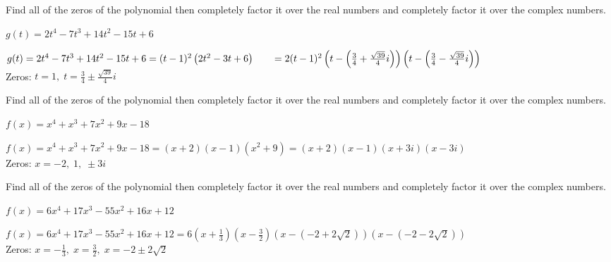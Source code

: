 \documentclass{ximera}
\begin{document}
\begin{problem}
Find all of the zeros of the polynomial then completely factor it over the real numbers and completely factor it over the complex numbers.

$g(t) = 2t^4-7t^3+14t^2-15t+6$

\begin{solution}
$g(t) = 2t^4-7t^3+14t^2-15t+6 = (t-1)^2 \left(2t^2 - 3t + 6\right)  \\
\phantom{f(t)} = 2 (t-1)^2 \left( t - \left( \frac{3}{4} +  \frac{\sqrt{39}}{4} i \right) \right)  \left( t - \left( \frac{3}{4} -  \frac{\sqrt{39}}{4} i \right) \right) $ \\
Zeros: $t = 1, \; t = \frac{3}{4}  \pm  \frac{\sqrt{39}}{4} i$
\end{solution}

\end{problem}

\begin{problem}
Find all of the zeros of the polynomial then completely factor it over the real numbers and completely factor it over the complex numbers.

$f(x) = x^4+x^3+7x^2+9x-18$

\begin{solution}
$f(x) = x^4+x^3+7x^2+9x-18 = (x+2)(x-1)\left(x^2+9\right) = (x+2)(x-1)(x+3i)(x-3i)$\\
Zeros:  $x = -2, \; 1, \; \pm 3i$
\end{solution}

\end{problem}

\begin{problem}
Find all of the zeros of the polynomial then completely factor it over the real numbers and completely factor it over the complex numbers.

$f(x) = 6x^4+17x^3-55x^2+16x+12$

\begin{solution}
$f(x) = 6x^4+17x^3-55x^2+16x+12 = 6 \left(x + \frac{1}{3} \right) \left(x - \frac{3}{2} \right) \left(x - \left( -2 + 2 \sqrt{2}\right)\right) \left(x - \left( -2 - 2 \sqrt{2}\right)\right)$ \\
Zeros:  $x = -\frac{1}{3}, \; x = \frac{3}{2}, \; x = -2 \pm 2 \sqrt{2}$
\end{solution}
\end{problem}
\end{document}
